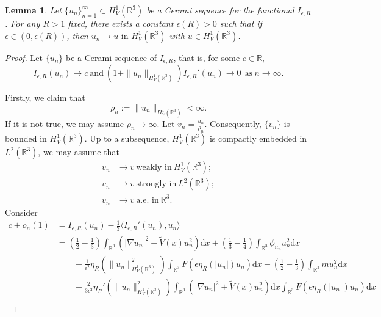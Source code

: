 \documentclass[10pt,a4paper]{amsart}
\newtheorem{lemma}{Lemma}
\begin{document}
\begin{lemma}\label{lem4}
Let $\{u_n\}_{n=1}^\infty\subset H^1_V(\mathbb R^3)$ be a Cerami sequence for the functional $I_{\epsilon,R}$. For any $R>1$ fixed, there exists a constant $\epsilon(R)>0$ such that if $\epsilon\in(0,\epsilon(R))$, then $u_n\rightarrow u\text{ in }H^1_V(\mathbb R^3)$ with $u\in H^1_V(\mathbb R^3)$.
\end{lemma}

\begin{proof}
    Let $\{u_n\}$ be a Cerami sequence of $I_{\epsilon,R}$, that is, for some $c\in \mathbb{R}$,
    $$I_{\epsilon,R}(u_n)\to c~\text{and}~(1+\|u_n\|_{H^{1}_{V}(\mathbb R^3)})I_{\epsilon,R}'(u_n)\to0\ ~\text{as}~n\to\infty.$$

Firstly, we claim that
$$\rho_n:=\|u_n\|_{H^{1}_{V}(\mathbb R^3)}<\infty.$$
If it is not true, we may assume $\rho_n\to\infty$. Let $v_n=\frac{u_n}{\rho_n}$. Consequently, $\{v_n\}$ is bounded in $H^{1}_{V}(\mathbb{R}^3)$. Up to a subsequence, $H^{1}_{V}(\mathbb{R}^{3})$ is compactly embedded in $L^2(\mathbb{R}^3)$, we may assume that
\begin{equation*}
		\begin{split}
	v_n&\to v~\text{weakly in}~H^{1}_{V}(\mathbb{R}^3);\\
	v_n&\to v~\text{strongly in}~L^{2}(\mathbb{R}^3);\\
	v_n&\to v~\text{a.e. in}~ \mathbb{R}^3.
	\end{split}\end{equation*}
Consider
\begin{equation*}
		\begin{split}
		c+o_{n}(1)&=I_{\epsilon,R}(u_n)-\frac{1}{3}\langle I_{\epsilon,R}'(u_n),u_n\rangle\\
		&=\left(\frac{1}{2}-\frac{1}{3}\right)\int_{\mathbb R^3}\left(|\nabla u_n|^2+\tilde V(x)u_n^2\right)\text{d}x+\left(\frac{1}{3}-\frac{1}{4}\right)\int_{\mathbb R^3}\phi_{u_n}u_n^2\text{d}x\\
        &\quad\quad-\frac{1}{\epsilon^2}\eta _{R}\left (\|u_n\|^{2}_{H^1_{V}(\mathbb{R}^3)}\right )\int_{\mathbb{R}^{3}}F\left (\epsilon \eta _{R} \left ( \left | u_n\right |\right )u_n\right )\text{d}x-\left(\frac{1}{2}-\frac{1}{3}\right)\int_{\mathbb{R}^3}m u^{2}_n\text{d}x\\
		&\quad\quad-\frac{2}{3\epsilon^{2}}\eta _{R}'\left ( \|u_n\|^{2}_{H^1_{V}(\mathbb{R}^3)} \right )\int_{\mathbb{R}^{3}}(|\nabla u_n|^2+\tilde V(x)u_n^2) \text{d}x\int_{\mathbb{R}^{3}}F\left (\epsilon\eta _{R}\left ( \left | u_n\right | \right ) u_n\right )\text{d}x\\

\end{split}
\end{equation*}
\end{proof}
\end{document}
